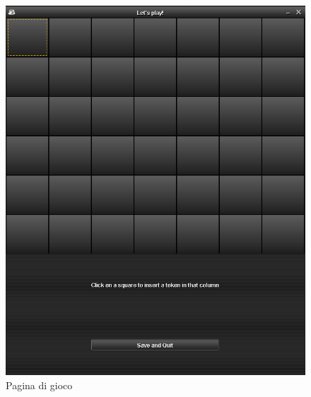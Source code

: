 \begin{figure}
    \centering
    \includegraphics[scale=0.5]{img/game-page}
    \caption{Pagina di gioco}
    \label{fig:game-page}
\end{figure}


